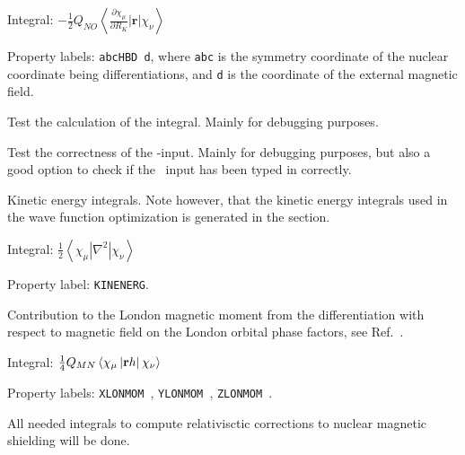 \begin{description}
\begin{list}{}{}
\item Integral: $-\frac{1}{2}Q_{NO}\left<\frac{\partial
\chi_{\mu}}{\partial R_K}\left|{\mathbf r}\right|\chi_{\nu}\right>$
\item Property labels: \verb|abcHBD d|, where \verb|abc| is the
symmetry coordinate of the nuclear coordinate being differentiations,
and \verb|d| is the coordinate of the external magnetic field.
\end{list}

\item[\Key{HDOBRT}] Test the calculation of the 
integral. Mainly for debugging purposes.

\item[\Key{INPTES}] Test the correctness of the -input. Mainly
for debugging purposes, but also a good option to check if the \molinp\ input
has been typed in correctly.

\item[\Key{KINENE}] Kinetic energy integrals. Note however, that the kinetic energy integrals used in the
wave function optimization is generated in the  section.

\begin{list}{}{}
\item Integral:
$\frac{1}{2}\left<\chi_{\mu}\left|\nabla^{2}\right|\chi_{\nu}\right>$
\item Property label: \verb|KINENERG|.
\end{list}

\item[\Key{LONMOM}] Contribution to the London magnetic
moment from
the differentiation with respect to magnetic field on the London
orbital phase factors, see Ref.~\cite{thpjjcp95}.

\begin{list}{}{}
\item Integral:
$\frac{1}{4}Q_{MN}\left<\chi_{\mu}\left|{\bf r}h\right|\chi_{\nu}\right>$
\item Property labels: \verb|XLONMOM |, \verb|YLONMOM |, \verb|ZLONMOM |.
\end{list}


\item[\Key{LRINTS}] All needed integrals to compute relativisctic corrections 
to nuclear magnetic shielding will be done. 



\end{description}
